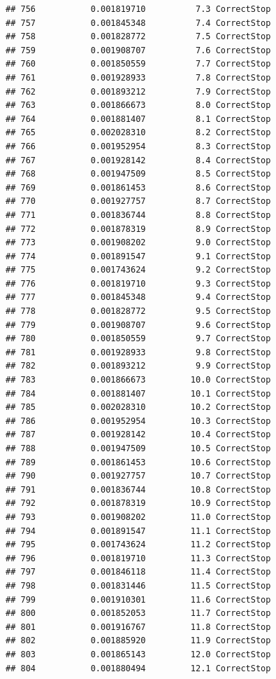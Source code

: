 \documentclass[
]{article}
\begin{document}
\begin{verbatim}
## 756           0.001819710          7.3 CorrectStop
## 757           0.001845348          7.4 CorrectStop
## 758           0.001828772          7.5 CorrectStop
## 759           0.001908707          7.6 CorrectStop
## 760           0.001850559          7.7 CorrectStop
## 761           0.001928933          7.8 CorrectStop
## 762           0.001893212          7.9 CorrectStop
## 763           0.001866673          8.0 CorrectStop
## 764           0.001881407          8.1 CorrectStop
## 765           0.002028310          8.2 CorrectStop
## 766           0.001952954          8.3 CorrectStop
## 767           0.001928142          8.4 CorrectStop
## 768           0.001947509          8.5 CorrectStop
## 769           0.001861453          8.6 CorrectStop
## 770           0.001927757          8.7 CorrectStop
## 771           0.001836744          8.8 CorrectStop
## 772           0.001878319          8.9 CorrectStop
## 773           0.001908202          9.0 CorrectStop
## 774           0.001891547          9.1 CorrectStop
## 775           0.001743624          9.2 CorrectStop
## 776           0.001819710          9.3 CorrectStop
## 777           0.001845348          9.4 CorrectStop
## 778           0.001828772          9.5 CorrectStop
## 779           0.001908707          9.6 CorrectStop
## 780           0.001850559          9.7 CorrectStop
## 781           0.001928933          9.8 CorrectStop
## 782           0.001893212          9.9 CorrectStop
## 783           0.001866673         10.0 CorrectStop
## 784           0.001881407         10.1 CorrectStop
## 785           0.002028310         10.2 CorrectStop
## 786           0.001952954         10.3 CorrectStop
## 787           0.001928142         10.4 CorrectStop
## 788           0.001947509         10.5 CorrectStop
## 789           0.001861453         10.6 CorrectStop
## 790           0.001927757         10.7 CorrectStop
## 791           0.001836744         10.8 CorrectStop
## 792           0.001878319         10.9 CorrectStop
## 793           0.001908202         11.0 CorrectStop
## 794           0.001891547         11.1 CorrectStop
## 795           0.001743624         11.2 CorrectStop
## 796           0.001819710         11.3 CorrectStop
## 797           0.001846118         11.4 CorrectStop
## 798           0.001831446         11.5 CorrectStop
## 799           0.001910301         11.6 CorrectStop
## 800           0.001852053         11.7 CorrectStop
## 801           0.001916767         11.8 CorrectStop
## 802           0.001885920         11.9 CorrectStop
## 803           0.001865143         12.0 CorrectStop
## 804           0.001880494         12.1 CorrectStop

\end{verbatim}
\end{document}
